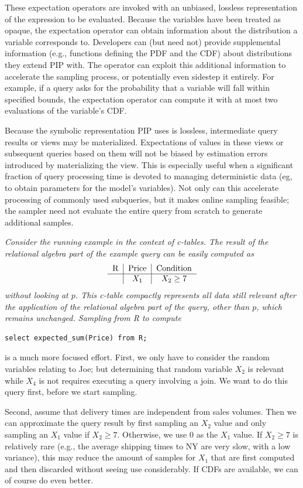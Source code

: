 These expectation operators are invoked with an unbiased, lossless representation of the expression to be evaluated.  Because the variables have been treated as opaque, the expectation operator can obtain information about the distribution a variable corresponds to.  Developers can (but need not) provide supplemental information (e.g., functions defining the PDF and the CDF) about distributions they extend PIP with.  The operator can exploit this additional information to accelerate the sampling process, or potentially even sidestep it entirely.  For example, if a query asks for the probability that a variable will fall within specified bounds, the expectation operator can compute it with at most two evaluations of the variable's CDF.

Because the symbolic representation PIP uses is lossless, intermediate query results or views may be materialized.  Expectations of values in these views or subsequent queries based on them will not be biased by estimation errors introduced by materializing the view.  This is especially useful when a significant fraction of query processing time is devoted to managing deterministic data (eg, to obtain parameters for the model's variables).  Not only can this accelerate processing of commonly used subqueries, but it makes online sampling feasible; the sampler need not evaluate the entire query from scratch to generate additional samples.

\begin{example}\em
Consider the running example in the context of c-tables. The result of the relational algebra part of the
example query can be easily computed as
\[
\begin{tabular}{c|c|c}
R & Price & Condition \\
\hline
& $X_1$ & $X_2 \ge 7$ \\
\end{tabular}
\]
without looking at $p$.
This c-table compactly represents all data still relevant after the
application of the relational algebra part of the query, other than $p$,
which remains unchanged.
Sampling from R to compute
\begin{verbatim}
select expected_sum(Price) from R;
\end{verbatim}
is a much more focused effort.
First, we only have to consider the random variables relating to Joe;
but determining that random variable $X_2$ is relevant while $X_4$
is not requires
executing a query involving a join. We want to do this query first, before
we start sampling.

Second, assume that delivery times are
independent from sales volumes. Then we can approximate the
query result
by first sampling an $X_2$ value and only sampling an $X_1$ value if $X_2 \ge 7$.
Otherwise, we use $0$ as the $X_1$ value.
If $X_2 \ge 7$ is relatively rare (e.g., the average shipping times to NY are
very slow, with a low variance), this may reduce the amount of samples
for $X_1$ that are first computed and then discarded without seeing use
considerably.
If CDFs are available, we can of course do even better.
%
\end{example}

